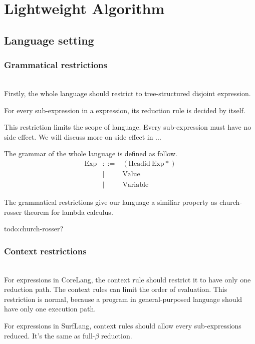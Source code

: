 \section{Lightweight Algorithm}
\label{sec3}

\subsection{Language setting}

\subsubsection{Grammatical restrictions}
\hfill\\
Firstly, the whole language should restrict to tree-structured disjoint expression.

\begin{Def}[disjoint]
For every sub-expression in a expression, its reduction rule is decided by itself.
\end{Def}

This restriction limits the scope of language. Every sub-expression must have no side effect. We will discuss more on side effect in ...

\begin{Def}
The grammar of the whole language is defined as follow.
\[
\begin{array}{rcl}
\mbox{Exp} &::=& (\mbox{Headid}~\mbox{Exp}*)\\
&|& \mbox{Value}\\
&|& \mbox{Variable}
\end{array}
\]
\end{Def}

The grammatical restrictions give our language a similiar property as church-rosser theorem for lambda calculus. 

todo:church-rosser?

\subsubsection{Context restrictions}
\hfill\\
For expressions in CoreLang, the context rule should restrict it to have only one reduction path. The context rules can limit the order of evaluation. This restriction is normal, because a program in general-purposed language should have only one execution path.\label{mark:ctx}

For expressions in SurfLang, context rules should allow every sub-expressions reduced. It's the same as full-$\beta$ reduction.

